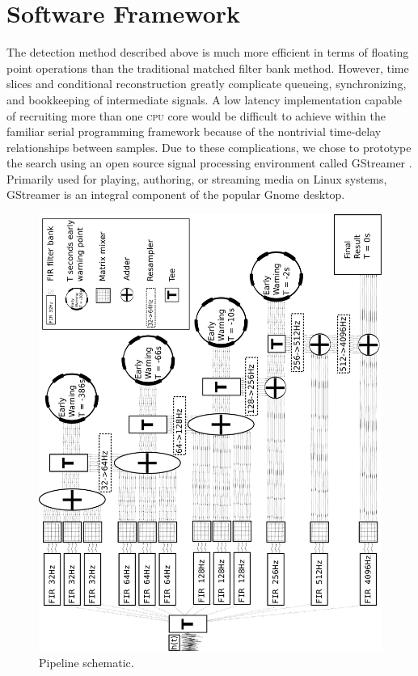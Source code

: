 \section{Software Framework}
\label{SECIII}\label{sec:analysis}


The detection method described above is much more efficient in terms of
floating point operations than the traditional matched filter bank method.
However, time slices and conditional reconstruction greatly complicate
queueing, synchronizing, and bookkeeping of intermediate signals.  A low
latency implementation capable of recruiting more than one \textsc{cpu} core
would be difficult to achieve within the familiar serial programming framework
because of the nontrivial time-delay relationships between samples.  Due to
these complications, we chose to prototype the search using an open source
signal processing environment called GStreamer \cite{gstreamer}.  Primarily
used for playing, authoring, or streaming media on Linux systems, GStreamer is
an integral component of the popular Gnome desktop.

\begin{figure}
\includegraphics[width=\textwidth, angle=-90]{lloid.pdf}
\caption{Pipeline schematic.}
\end{figure}

